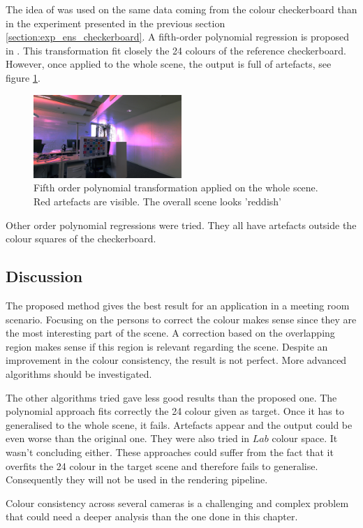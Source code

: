 
The idea of \cite{eschbach_color_2015} was used on the same data coming from the colour checkerboard than in the experiment presented in the previous section \ref{section:exp_ens_checkerboard}. A fifth-order polynomial regression is proposed in \cite{eschbach_color_2015}. This transformation fit closely the 24 colours of the reference checkerboard. However, once applied to the whole scene, the output is full of artefacts, see figure \ref{figure:sub_poly_5_2015}.

\begin{figure}[H]
    \centering
    \includegraphics[width=0.50\textwidth]{images/visual_enhancement/colour/sub_poly_5_2015.jpg}
    \caption{Fifth order polynomial transformation applied on the whole scene. Red artefacts are visible. The overall scene looks 'reddish'}
    \label{figure:sub_poly_5_2015}
\end{figure}

Other order polynomial regressions were tried. They all have artefacts outside the colour squares of the checkerboard.

\subsection{Discussion}

The proposed method gives the best result for an application in a meeting room scenario. Focusing on the persons to correct the colour makes sense since they are the most interesting part of the scene. A correction based on the overlapping region makes sense if this region is relevant regarding the scene. Despite an improvement in the colour consistency, the result is not perfect. More advanced algorithms should be investigated.

The other algorithms tried gave less good results than the proposed one. The polynomial approach fits correctly the 24 colour given as target. Once it has to generalised to the whole scene, it fails. Artefacts appear and the output could be even worse than the original one. They were also tried in $Lab$ colour space. It wasn't concluding either. These approaches could suffer from the fact that it overfits the 24 colour in the target scene and therefore fails to generalise. Consequently they will not be used in the rendering pipeline.


Colour consistency across several cameras is a challenging and complex problem that could need a deeper analysis than the one done in this chapter. 
